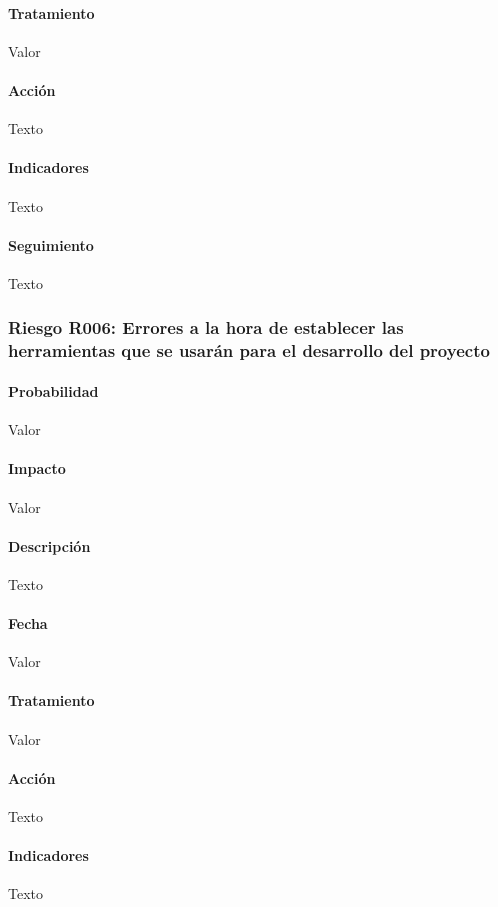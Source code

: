 \documentclass[10pt,a4paper]{article}
\begin{document}
				\paragraph{Tratamiento} Valor %
				\paragraph{Acción} Texto %
				\paragraph{Indicadores} Texto %
				\paragraph{Seguimiento}	Texto %
				
				\subsubsection{Riesgo R006: Errores a la hora de establecer las herramientas que se usarán para el desarrollo del proyecto}
				\paragraph{Probabilidad} Valor
				\paragraph{Impacto}	Valor
				\paragraph{Descripción} Texto
				\paragraph{Fecha} Valor %
				\paragraph{Tratamiento} Valor %
				\paragraph{Acción} Texto %
				\paragraph{Indicadores} Texto %
\end{document}
